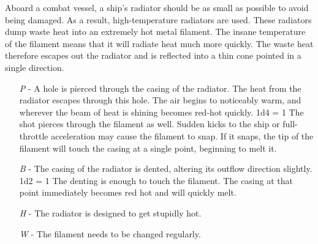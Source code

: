 \documentclass[a4paper]{article}
\begin{document}
Aboard a combat vessel, a ship's radiator should be as small as possible to avoid being damaged. As a result, high-temperature radiators are used. These radiators dump waste heat into an extremely hot metal filament. The insane temperature of the filament means that it will radiate heat much more quickly. The waste heat therefore escapes out the radiator and is reflected into a thin cone pointed in a single direction.
\begin{enumerate}
\item [\textit{P}] - A hole is pierced through the casing of the radiator. The heat from the radiator escapes through this hole. The air begins to noticeably warm, and wherever the beam of heat is shining becomes red-hot quickly. \newline \hspace*{-3pt} 1d4 = 1 The shot pierces through the filament as well. Sudden kicks to the ship or full-throttle acceleration may cause the filament to snap. If it snaps, the tip of the filament will touch the casing at a single point, beginning to melt it.
\item [\textit{B}] - The casing of the radiator is dented, altering its outflow direction slightly. \newline \hspace*{3pt} 1d2 = 1 The denting is enough to touch the filament. The casing at that point immediately becomes red hot and will quickly melt.
\item [\textit{H}] - The radiator is designed to get stupidly hot.
\item [\textit{W}] - The filament needs to be changed regularly. 
\end{enumerate}
\end{document}
